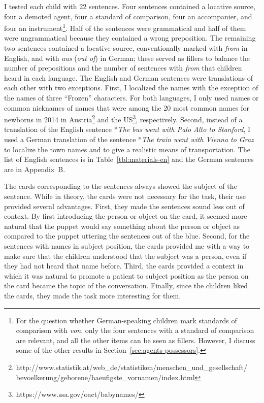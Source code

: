 \documentclass[lucida]{sp} %
\begin{document}
I tested each child with 22 sentences. Four sentences contained a locative source, four a demoted agent, four a standard of comparison, four an accompanier, and four an instrument\footnote{For the question whether German-speaking children mark standards of comparison with \textit{von}, only the four sentences with a standard of comparison are relevant, and all the other items can be seen as fillers. However, I discuss some of the other results in Section~\ref{sec:agents-possessors}.}. Half of the sentences were grammatical and half of them were ungrammatical because they contained a wrong preposition. The remaining two sentences contained a locative source, conventionally marked with \textit{from} in English, and with \textit{aus} (\textit{out of}) in German; these served as fillers to balance the number of prepositions and the number of sentences with \textit{from} that children heard in each language. The English and German sentences were translations of each other with two exceptions. First, I localized the names with the exception of the names of three ``Frozen'' characters. For both languages, I only used names or common nicknames of names that were among the 20 most common names for newborns in 2014 in Austria\footnote{http://www.statistik.at/web{\_}de/statistiken/menschen{\_}und{\_}gesellschaft/ bevoelkerung/geborene/haeufigste{\_}vornamen/index.html} and the US\footnote{https://www.ssa.gov/oact/babynames/}, respectively.  Second, instead of a translation of the English sentence *\textit{The bus went with Palo Alto to Stanford}, I used a German translation of the sentence *\textit{The train went with Vienna to Graz} to localize the town names and to give a realistic means of transportation. The list of English sentences is in Table~\ref{tbl:materials-en} and the German sentences are in Appendix~{B}.

The cards corresponding to the sentences always showed the subject of the sentence. While in theory, the cards were not necessary for the task, their use provided several advantages. First, they made the sentences sound less out of context. By first introducing the person or object on the card, it seemed more natural that the puppet would say something about the person or object as compared to the puppet uttering the sentences out of the blue. Second, for the sentences with names in subject position, the cards provided me with a way to make sure that the children understood that the subject was a person, even if they had not heard that name before. Third, the cards provided a context in which it was natural to promote a patient to subject position as the person on the card became the topic of the conversation. Finally, since the children liked the cards, they made the task more interesting for them.
\end{document}
